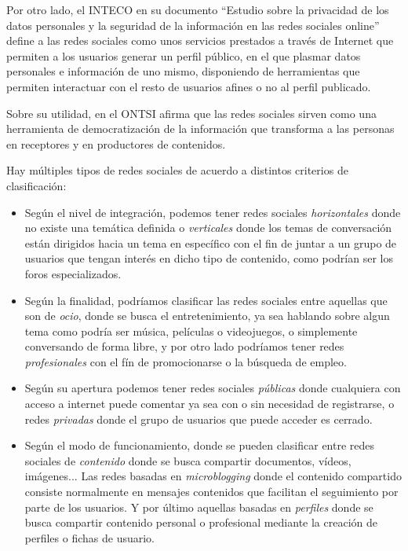 Por otro lado, el INTECO en su documento ``Estudio sobre la privacidad de los datos
personales y la seguridad de la información en las redes sociales online'' define a las redes sociales como unos \guillemotleft servicios prestados a través de Internet que permiten a los usuarios generar un perfil público, en el que plasmar datos personales e
información de uno mismo, disponiendo de herramientas que permiten interactuar
con el resto de usuarios afines o no al perfil publicado\guillemotright.

Sobre su utilidad, en \cite{ontsi_redes_sociales} el ONTSI afirma que las redes sociales sirven como una herramienta de \guillemotleft democratización de la información que transforma a las personas en receptores y en productores de contenidos\guillemotright.

Hay múltiples tipos de redes sociales de acuerdo a distintos criterios de clasificación:
\begin{itemize}
    \item Según el nivel de integración, podemos tener redes sociales \textit{horizontales} donde no existe una temática definida o \textit{verticales} donde los temas de conversación están dirigidos hacia un tema en específico con el fin de juntar a un grupo de usuarios que tengan interés en dicho tipo de contenido, como podrían ser los foros especializados.
    \item Según la finalidad, podríamos clasificar las redes sociales entre aquellas que son de \textit{ocio}, donde se busca el entretenimiento, ya sea hablando sobre algun tema como podría ser música, películas o videojuegos, o simplemente conversando de forma libre, y por otro lado podríamos tener redes \textit{profesionales} con el fín de promocionarse o la búsqueda de empleo.
    \item Según su apertura podemos tener redes sociales \textit{públicas} donde cualquiera con acceso a internet puede comentar ya sea con o sin necesidad de registrarse, o redes \textit{privadas} donde el grupo de usuarios que puede acceder es cerrado.
    \item Según el modo de funcionamiento, donde se pueden clasificar entre redes sociales de \textit{contenido} donde se busca compartir documentos, vídeos, imágenes... Las redes basadas en \textit{microblogging} donde el contenido compartido consiste normalmente en mensajes contenidos que facilitan el seguimiento por parte de los usuarios. Y por último aquellas basadas en \textit{perfiles} donde se busca compartir contenido personal o profesional mediante la creación de perfiles o fichas de usuario.
\end{itemize}

